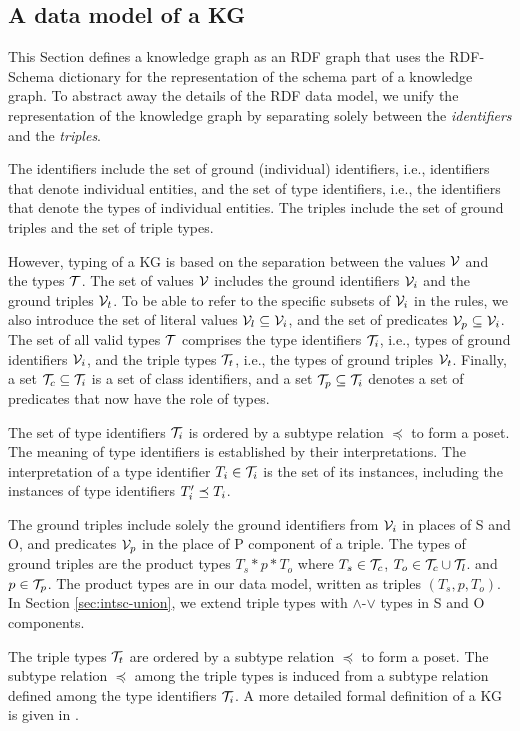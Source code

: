 \documentclass[runningheads]{llncs}
\newcommand{\V}{{\cal V}}
\newcommand{\T}{{\cal T}}
\begin{document}
\subsection{A data model of a KG}

This Section defines a knowledge graph as an RDF graph that uses the
RDF-Schema dictionary \cite{rdfschema} for the representation of the
schema part of a knowledge graph. To abstract away the details of the
RDF data model, we unify the representation of the knowledge graph by
separating solely between the \emph{identifiers} and the
\emph{triples}.

The identifiers include the set of ground (individual) identifiers,
i.e., identifiers that denote individual entities, and the set of type
identifiers, i.e., the identifiers that denote the types of individual
entities. The triples include the set of ground triples and the set of
triple types.

However, typing of a KG is based on the separation between the values
$\V$ and the types $\T$. The set of values $\V$ includes the ground
identifiers $\V_i$ and the ground triples $\V_t$. To be able to refer
to the specific subsets of $\V_i$ in the rules, we also introduce the
set of literal values $\V_l\subseteq\V_i$, and the set of predicates
$\V_p\subseteq\V_i$. The set of all valid types $\T$ comprises the
type identifiers $\T_i$, i.e., types of ground identifiers $\V_i$, and
the triple types $\T_t$, i.e., the types of ground triples $\V_t$.
Finally, a set $\T_c\subseteq\T_i$ is a set of class identifiers, and
a set $\T_p\subseteq\T_i$ denotes a set of predicates that now have
the role of types.

The set of type identifiers $\T_i$ is ordered by a subtype relation
$\preceq$ to form a poset. The meaning of type identifiers is
established by their interpretations. The interpretation of a type
identifier $T_i\in\T_i$ is the set of its instances, including the
instances of type identifiers $T_i'\preceq\/T_i$.

The ground triples include solely the ground identifiers from $\V_i$
in places of S and O, and predicates $\V_p$ in the place of P
component of a triple. The types of ground triples are the product
types $T_s*p*T_o$ where $T_s\in\T_c$, $T_o\in\T_c\cup\T_l$. and
$p\in\T_p$. The product types are in our data model, written as
triples $(T_s,p,T_o)$. In Section \ref{sec:intsc-union}, we extend
triple types with $\land$-$\lor$ types in S and O components.

The triple types $\T_t$ are ordered by a subtype relation $\preceq$ to
form a poset. The subtype relation $\preceq$ among the triple types is
induced from a subtype relation defined among the type identifiers
$\T_i$. A more detailed formal definition of a KG is given in
\cite{Savnik2025}.
\end{document}
